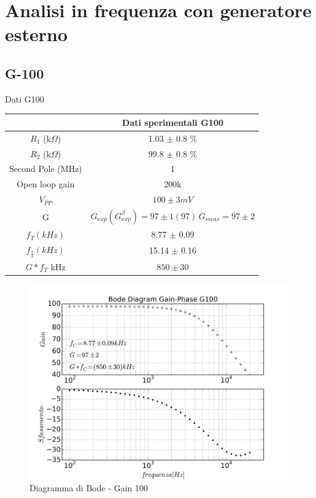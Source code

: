 \documentclass{beamer}
\begin{document}
\section{Analisi in frequenza con generatore esterno}

\subsection{G-100}

\begin{frame}{Dati G100}

{
\centering
\begin{tabular}{|c|c|}
\hline  &  \textbf{Dati sperimentali G100} \\ 
\hline $R_1$ (k$\Omega$) &  1.03 $\pm$ 0.8 \% \\ 
\hline $R_2$ (k$\Omega$) & 99.8 $\pm$ 0.8 \%  \\ 
\hline Second Pole (MHz) & 1   \\ 
\hline Open loop gain & 200k    \\ 
\hline $V_{PP}$ & $100  \pm 3 \si{mV} $ \\ 
\hline G &  $G_{exp}(G_{exp}^{\beta})  = 97 \pm 1 (97) \, G_{meas} = 97 \pm 2 $ \\ 
\hline $f_T (kHz)$ &  8.77 $\pm$ 0.09 \\
\hline $f_{\frac{1}{2}} (kHz)$ &  15.14 $\pm$ 0.16 \\
\hline $G*f_{T}$ \si{kHz} & $ 850 \pm 30 $\\
\hline
\end{tabular} 

}
\end{frame}

\begin{frame}
\begin{figure}
\centering
\includegraphics[width=1\linewidth]{./es_8_bode_diag}
\caption{Diagramma di Bode - Gain 100}
\label{fig:es_8_bode_diag}
\end{figure}

\end{frame}
\end{document}
